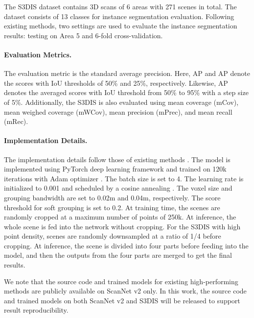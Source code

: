 \documentclass[10pt,twocolumn,letterpaper]{article}
\begin{document}
	The S3DIS dataset contains 3D scans of 6 areas with 271 scenes in total. The dataset consists of 13 classes for instance segmentation evaluation. Following existing methods, two settings are used to evaluate the instance segmentation results: testing on Area 5 and 6-fold cross-validation.
	
	\paragraph{Evaluation Metrics.} The evaluation metric is the standard average precision. Here, AP and AP denote the scores with IoU thresholds of 50\% and 25\%, respectively. Likewise, AP denotes the averaged scores with IoU threshold from 50\% to 95\% with a step size of 5\%. Additionally, the S3DIS is also evaluated using mean coverage (mCov), mean weighed coverage (mWCov), mean precision (mPrec), and mean recall (mRec). 
	
	\paragraph{Implementation Details.}
	The implementation details follow those of existing methods \cite{jiang2020pointgroup,chen2021hierarchical}. The model is implemented using PyTorch deep learning framework \cite{paszke2017automatic} and trained on 120k iterations with Adam optimizer \cite{kingma2014adam}. The batch size is set to 4. The learning rate is initialized to 0.001 and scheduled by a cosine annealing \cite{loshchilov2016sgdr}. The voxel size and grouping bandwidth  are set to 0.02m and 0.04m, respectively. The score threshold for soft grouping  is set to 0.2. At training time, the scenes are randomly cropped at a maximum number of points of 250k. At inference, the whole scene is fed into the network without cropping. For the S3DIS with high point density, scenes are randomly downsampled at a ratio of 1/4 before cropping. At inference, the scene is divided into four parts before feeding into the model, and then the outputs from the four parts are merged to get the final results. 
	


	We note that the source code and trained models for existing high-performing methods are publicly available on ScanNet v2 only. In this work, the source code and trained models on both ScanNet v2 and S3DIS will be released to support result reproducibility. 
	
	
	
\end{document}
